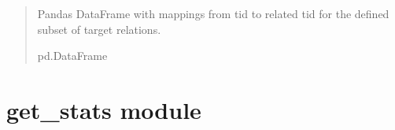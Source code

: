 \documentclass[letterpaper,10pt,english]{sphinxmanual}
\begin{document}
\begin{fulllineitems}
\begin{quote}
\begin{description}
\sphinxAtStartPar
Pandas DataFrame with mappings from tid to related tid
for the defined subset of target relations.

\sphinxAtStartPar
pd.DataFrame

\end{description}\end{quote}

\end{fulllineitems}


\sphinxstepscope


\section{get\_stats module}
\label{\detokenize{get_stats:module-get_stats}}\label{\detokenize{get_stats:get-stats-module}}\label{\detokenize{get_stats::doc}}
\end{document}

